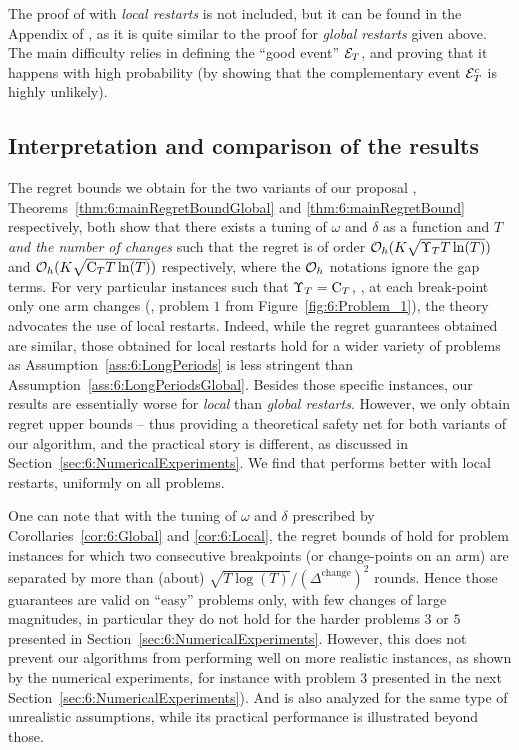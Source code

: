 The proof of \GLRklUCB{} with \emph{local restarts} is not included, but it can be found in the Appendix of \cite{Besson2019GLRT}, as it is quite similar to the proof for \emph{global restarts} given above. The main difficulty relies in defining the ``good event'' $\mathcal{E}_T$, and proving that it happens with high probability (by showing that the complementary event $\mathcal{E}_T^c$ is highly unlikely).


\subsection{Interpretation and comparison of the results}
\label{sub:6:interpretationRegretBounds}

The regret bounds we obtain for the two variants of our proposal \GLRklUCB{},
Theorems~\ref{thm:6:mainRegretBoundGlobal} and \ref{thm:6:mainRegretBound} respectively,
both show that there exists a tuning of $\omega$ and $\delta$ as a function and $T$ \emph{and the number of changes} such that the regret is of order $\mathcal{O}_h(K\sqrt{\Upsilon_T T \ln(T)})$ and $\mathcal{O}_h(K\sqrt{\mathrm{C}_T T \ln(T)})$ respectively, where the $\mathcal{O}_h$ notations ignore the gap terms.
%
For very particular instances such that $\Upsilon_T = \mathrm{C}_T$, \ie, at each break-point only one arm changes (\eg, problem $1$ from Figure~\ref{fig:6:Problem_1}), the theory advocates the use of local restarts.
%
Indeed, while the regret guarantees obtained are similar, those obtained for local restarts hold for a wider variety of problems as Assumption~\ref{ass:6:LongPeriods} is less stringent than Assumption~\ref{ass:6:LongPeriodsGlobal}.
%
Besides those specific instances, our results are essentially worse for \emph{local} than \emph{global restarts}. However, we only obtain regret upper bounds -- thus providing a theoretical safety net for both variants of our algorithm, and the practical story is different, as discussed in Section~\ref{sec:6:NumericalExperiments}.
We find that \GLRklUCB{} performs better with local restarts, uniformly on all problems.

One can note that with the tuning of $\omega$ and $\delta$ prescribed by Corollaries~\ref{cor:6:Global} and \ref{cor:6:Local}, the regret bounds of \GLRklUCB{} hold for problem instances for which two consecutive breakpoints (or change-points on an arm) are separated by more than (about) $\sqrt{T\log(T)}/(\Delta^{\text{change}})^2$ rounds.
Hence those guarantees are valid on ``easy'' problems only, with few changes of large magnitudes, in particular they do not hold for the harder problems $3$ or $5$ presented in Section~\ref{sec:6:NumericalExperiments}.
%
However, this does not prevent our algorithms from performing well on more realistic instances, as shown by the numerical experiments,
for instance with problem $3$ presented in the next Section~\ref{sec:6:NumericalExperiments}).
%
And \MUCB{} \cite{CaoZhenKvetonXie18} is also analyzed for the same type of unrealistic assumptions, while its practical performance is illustrated beyond those.


